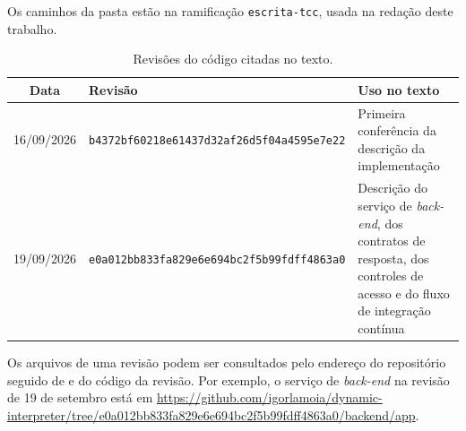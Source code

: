 Os caminhos da pasta  estão na ramificação \texttt{escrita-tcc}, usada na redação deste trabalho.

\begin{table}[htbp]
\centering
\caption{Revisões do código citadas no texto.}
\label{tab:ap-repositorio-revisoes}
\footnotesize
\renewcommand{\arraystretch}{1.2}
\begin{tabular}{|c|p{6.6cm}|p{5.2cm}|}
\hline
\textbf{Data} & \textbf{Revisão} & \textbf{Uso no texto} \\\hline
16/09/2026 & \texttt{b4372bf60218e61437d32af26d5f04a4595e7e22} & Primeira conferência da descrição da implementação \\\hline
19/09/2026 & \texttt{e0a012bb833fa829e6e694bc2f5b99fdff4863a0} & Descrição do serviço de \textit{back-end}, dos contratos de resposta, dos controles de acesso e do fluxo de integração contínua \\\hline
\end{tabular}
\end{table}

Os arquivos de uma revisão podem ser consultados pelo endereço do repositório seguido de  e do código da revisão. Por exemplo, o serviço de \textit{back-end} na revisão de 19 de setembro está em \url{https://github.com/igorlamoia/dynamic-interpreter/tree/e0a012bb833fa829e6e694bc2f5b99fdff4863a0/backend/app}.
